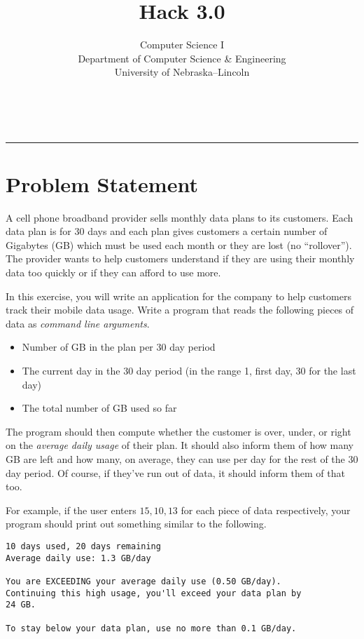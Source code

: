 \documentclass[12pt]{scrartcl}
\title{Hack 3.0}\let\Title\@title
\subtitle{Computer Science I\\
{\small
\vskip1cm
Department of Computer Science \& Engineering \\
University of Nebraska--Lincoln}
\vskip-1cm}
\date{~}
\begin{document}
\maketitle

\hrule

 

\section*{Problem Statement}

A cell phone broadband provider sells monthly data plans to its
customers.  Each data plan is for 30 days and each plan gives
customers a certain number of Gigabytes (GB) which must be used 
each month or they are lost (no ``rollover'').  The provider wants
to help customers understand if they are using their monthly data
too quickly or if they can afford to use more.

In this exercise, you will write an application for the company
to help customers track their mobile data usage.  Write a program
that reads the following pieces of data as \emph{command line arguments}.
\begin{itemize}
  \item Number of GB in the plan per 30 day period
  \item The current day in the 30 day period (in the range 1, first day, 
  30 for the last day)
  \item The total number of GB used so far
\end{itemize}
The program should then compute whether the customer is over, 
under, or right on the \emph{average daily usage} of their plan.  
It should also inform them of how many GB are left and how many, 
on average, they can use per day for the rest of the 30 day period.  
Of course, if they've run out of data, it should inform them of that 
too.

For example, if the user enters $15, 10, 13$ for each piece of data
respectively, your program should print out something similar to 
the following.

\begin{verbatim}
10 days used, 20 days remaining
Average daily use: 1.3 GB/day

You are EXCEEDING your average daily use (0.50 GB/day).
Continuing this high usage, you'll exceed your data plan by
24 GB.

To stay below your data plan, use no more than 0.1 GB/day.
\end{verbatim}
\end{document}
